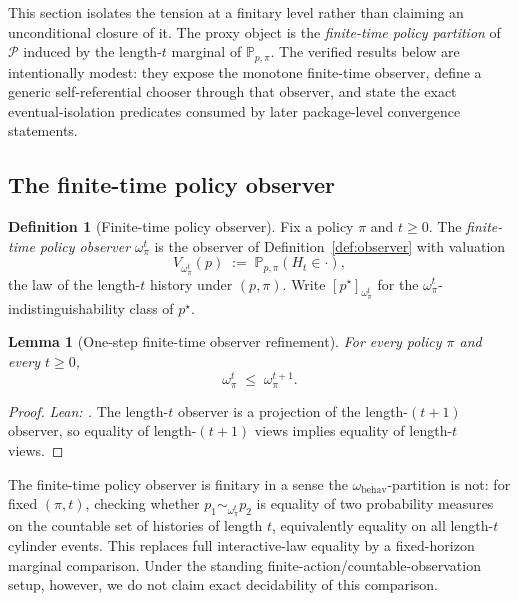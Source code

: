 \documentclass[11pt]{article}
\newtheorem{lemma}[theorem]{Lemma}
\theoremstyle{definition}
\newtheorem{definition}[theorem]{Definition}
\theoremstyle{remark}
\theoremstyle{plain}
\theoremstyle{definition}
\newcommand{\Pcal}{\mathcal{P}}
\newcommand{\Prob}{\mathbb{P}}
\begin{document}
This section isolates the tension at a finitary level rather than claiming an unconditional closure of it. The proxy object is the \emph{finite-time policy partition} of $\Pcal$ induced by the length-$t$ marginal of $\Prob_{p,\pi}$. The verified results below are intentionally modest: they expose the monotone finite-time observer, define a generic self-referential chooser through that observer, and state the exact eventual-isolation predicates consumed by later package-level convergence statements.

\subsection{The finite-time policy observer}
\label{sec:finite-time-policy-observer}

\begin{definition}[Finite-time policy observer]
\label{def:finite-time-policy-observer}
Fix a policy $\pi$ and $t\ge 0$. The \emph{finite-time policy observer} $\omega_\pi^t$ is the observer of Definition~\ref{def:observer} with valuation
\[
V_{\omega_\pi^t}(p)\;:=\;\Prob_{p,\pi}(H_t\in\cdot),
\]
the law of the length-$t$ history under $(p,\pi)$. Write $[p^\star]_{\omega_\pi^t}$ for the $\omega_\pi^t$-indistinguishability class of $p^\star$.
\end{definition}

\begin{lemma}[One-step finite-time observer refinement]
\label{lem:monotone-refinement}
For every policy $\pi$ and every $t\ge 0$,
\[
\omega_\pi^t\;\le\;\omega_\pi^{t+1}.
\]
\end{lemma}

\begin{proof}
\noindent\emph{Lean: .}
The length-$t$ observer is a projection of the length-$(t+1)$ observer, so equality of length-$(t+1)$ views implies equality of length-$t$ views.
\end{proof}

The finite-time policy observer is finitary in a sense the $\omega_{\mathrm{behav}}$-partition is not: for fixed $(\pi,t)$, checking whether $p_1\sim_{\omega_\pi^t}p_2$ is equality of two probability measures on the countable set of histories of length $t$, equivalently equality on all length-$t$ cylinder events. This replaces full interactive-law equality by a fixed-horizon marginal comparison. Under the standing finite-action/countable-observation setup, however, we do not claim exact decidability of this comparison.
\end{document}
